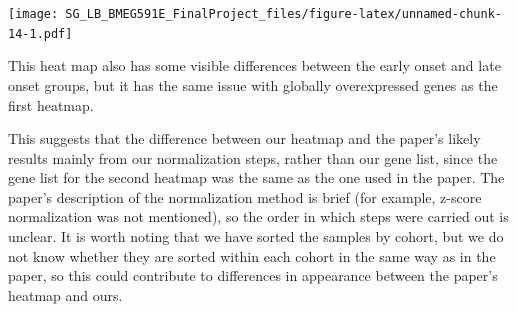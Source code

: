 \documentclass[
]{article}
\newenvironment{Shaded}{\begin{snugshade}}{\end{snugshade}}
\newcommand{\AttributeTok}[1]{\textcolor[rgb]{0.77,0.63,0.00}{#1}}
\newcommand{\CommentTok}[1]{\textcolor[rgb]{0.56,0.35,0.01}{\textit{#1}}}
\newcommand{\ConstantTok}[1]{\textcolor[rgb]{0.00,0.00,0.00}{#1}}
\newcommand{\FloatTok}[1]{\textcolor[rgb]{0.00,0.00,0.81}{#1}}
\newcommand{\FunctionTok}[1]{\textcolor[rgb]{0.00,0.00,0.00}{#1}}
\newcommand{\NormalTok}[1]{#1}
\newcommand{\OtherTok}[1]{\textcolor[rgb]{0.56,0.35,0.01}{#1}}
\newcommand{\SpecialCharTok}[1]{\textcolor[rgb]{0.00,0.00,0.00}{#1}}
\newcommand{\StringTok}[1]{\textcolor[rgb]{0.31,0.60,0.02}{#1}}
\begin{document}
\begin{Shaded}
\end{Shaded}

\texttt{[image: SG\_LB\_BMEG591E\_FinalProject\_files/figure-latex/unnamed-chunk-14-1.pdf]}

This heat map also has some visible differences between the early onset
and late onset groups, but it has the same issue with globally
overexpressed genes as the first heatmap.

This suggests that the difference between our heatmap and the paper's
likely results mainly from our normalization steps, rather than our gene
list, since the gene list for the second heatmap was the same as the one
used in the paper. The paper's description of the normalization method
is brief (for example, z-score normalization was not mentioned), so the
order in which steps were carried out is unclear. It is worth noting
that we have sorted the samples by cohort, but we do not know whether
they are sorted within each cohort in the same way as in the paper, so
this could contribute to differences in appearance between the paper's
heatmap and ours.
\end{document}
